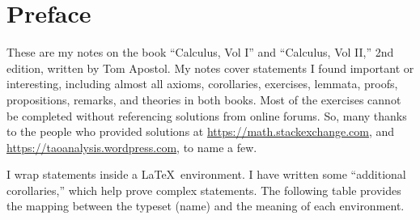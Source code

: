 \chapter*{Preface}

These are my notes on the book ``Calculus, Vol I'' and ``Calculus, Vol II,'' 2nd edition, written by Tom Apostol.
My notes cover statements I found important or interesting, including almost all axioms, corollaries, exercises, lemmata, proofs, propositions, remarks, and theories in both books.
Most of the exercises cannot be completed without referencing solutions from online forums.
So, many thanks to the people who provided solutions at \url{https://math.stackexchange.com}, and \url{https://taoanalysis.wordpress.com}, to name a few.

I wrap statements inside a \LaTeX\ environment.
I have written some ``additional corollaries,'' which help prove complex statements.
The following table provides the mapping between the typeset (name) and the meaning of each environment.
